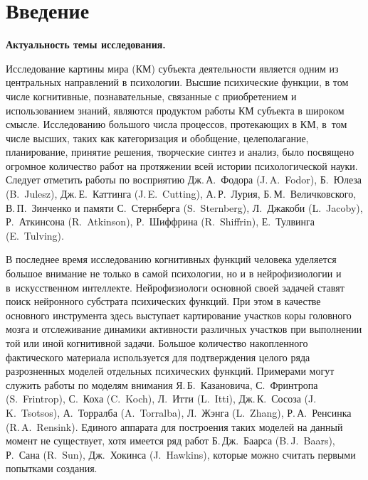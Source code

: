\chapter*{Введение}							%
\textbf{Актуальность темы исследования.} 

Исследование картины мира (КМ) субъекта деятельности является одним из центральных направлений в психологии. Высшие психические функции, в том числе когнитивные, познавательные, связанные с приобретением и использованием знаний, являются продуктом работы КМ субъекта в широком смысле. Исследованию большого числа процессов, протекающих в КМ, в~том числе высших, таких как категоризация и обобщение, целеполагание, планирование, принятие решения, творческие синтез и анализ, было посвящено огромное количество работ на протяжении всей истории психологической науки. Следует отметить работы по восприятию Дж.\,А.~Фодора (J.\,A.~Fodor), Б.~Юлеза (B.~Julesz), Дж.\,Е.~Каттинга (J.\,E.~Cutting), А.\,Р.~Лурия, Б.\,М.~Величковского, В.\,П.~Зинченко и памяти С.~Стернберга (S.~Sternberg), Л.~Джакоби (L.~Jacoby), Р.~Аткинсона (R.~Atkinson), Р.~Шиффрина (R.~Shiffrin), Е.~Тулвинга (E.~Tulving).

В последнее время исследованию когнитивных функций человека уделяется большое внимание не только в самой психологии, но и в нейрофизиологии и в~искусственном интеллекте. Нейрофизиологи основной своей задачей ставят поиск нейронного субстрата психических функций. При этом в качестве основного инструмента здесь выступает картирование участков коры головного мозга и отслеживание динамики активности различных участков при выполнении той или иной когнитивной задачи. Большое количество накопленного фактического материала используется для подтверждения целого ряда разрозненных моделей отдельных психических функций. Примерами могут служить работы по моделям внимания Я.\,Б.~Казановича, С.~Фринтропа (S.~Frintrop), С.~Коха (C.~Koch), Л.~Итти (L.~Itti), Дж.\,К.~Сосоза (J.\,K.~Tsotsos), А.~Торралба (A.~Torralba), Л.~Жэнга (L.~Zhang), Р.\,А.~Ренсинка (R.\,A.~Rensink). Единого аппарата для построения таких моделей на данный момент не существует, хотя имеется ряд работ Б.\,Дж.~Баарса (B.\,J.~Baars), Р.~Сана (R.~Sun), Дж.~Хокинса (J.~Hawkins), которые можно считать первыми попытками создания.

